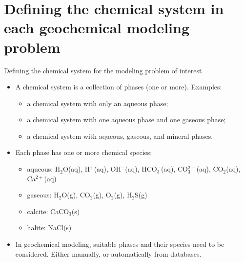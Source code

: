 %
\section{Defining the chemical system in each geochemical modeling problem}
\begin{frame}[<+->]{Defining the chemical system for the modeling problem of interest}
\begin{itemize}
\item A chemical system is a collection of phases (one or more). Examples:
\begin{itemize}
\item a chemical system with only an aqueous phase;
\item a chemical system with one aqueous phase and one gaseous phase;
\item a chemical system with aqueous, gaseous, and mineral phases.
\end{itemize}
\item Each phase has one or more chemical species:
\begin{itemize}
\item aqueous: H$_{2}$O(aq), H$^{+}$(aq), OH$^{-}$(aq), HCO$_{3}^{-}$(aq),
CO$_{3}^{2-}$(aq), CO$_{2}$(aq), Ca$^{2+}$(aq)
\item gaseous: H$_{2}$O(g), CO$_{2}$(g), O$_{2}$(g), H$_{2}$S(g)
\item calcite: CaCO$_{3}$(s)
\item halite: NaCl(s)
\end{itemize}
\item In geochemical modeling, suitable phases and their species need to
be considered. Either manually, or automatically from databases.
\end{itemize}
\end{frame}
%
%
